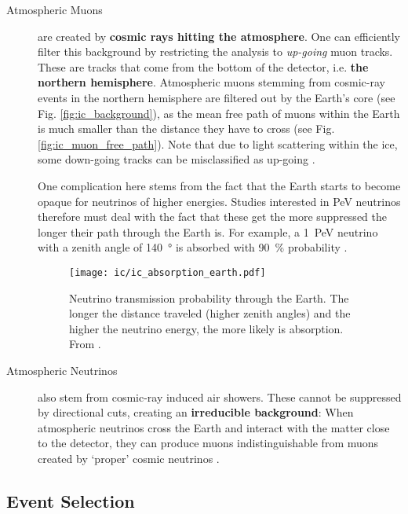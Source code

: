 \begin{description}
    \item[Atmospheric Muons] are created by \textbf{cosmic rays hitting the atmosphere}. One can efficiently filter this background by restricting the analysis to \textit{up-going} muon tracks. These are tracks that come from the bottom of the detector, i.e. \textbf{the northern hemisphere}. Atmospheric muons stemming from cosmic-ray events in the northern hemisphere are filtered out by the Earth's core (see Fig. \ref{fig:ic_background}), as the mean free path of muons within the Earth is much smaller  than the distance they have to cross (see Fig. \ref{fig:ic_muon_free_path}). Note that due to light scattering within the ice, some down-going tracks can be misclassified as up-going .

    One complication here stems from the fact that the Earth starts to become opaque for neutrinos of higher energies. Studies interested in \si{\peta\eV} neutrinos therefore must deal with the fact that these get the more suppressed the longer their path through the Earth is. For example, a \SI{1}{\peta\eV} neutrino with a zenith angle of \SI{140}{\degree} is absorbed with \SI{90}{\percent} probability .

    \begin{figure}[htb]
        \texttt{[image: ic/ic\_absorption\_earth.pdf]}
        \caption[Neutrino absorption in the Earth]{Neutrino transmission probability through the Earth. The longer the distance traveled (higher zenith angles) and the higher the neutrino energy, the more likely is absorption. From \cite{Aartsen2017c}.}
    \end{figure}

    \item[Atmospheric Neutrinos] also stem from cosmic-ray induced air showers. These cannot be suppressed by directional cuts, creating an \textbf{irreducible background}: When atmospheric neutrinos cross the Earth and interact with the matter close to the detector, they can produce muons indistinguishable from muons created by `proper' cosmic neutrinos \cite{Ahlers2018a}.

\end{description}

\subsection{Event Selection} \label{ic_event_selection}

